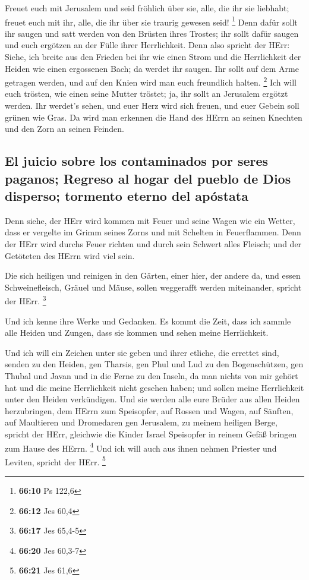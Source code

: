  Freuet euch mit Jerusalem und seid fröhlich über sie,
alle, die ihr sie liebhabt; freuet euch mit ihr, alle, die ihr über sie
traurig gewesen seid! \footnote{\textbf{66:10} Ps 122,6} 
Denn dafür sollt ihr saugen und satt werden von den Brüsten ihres
Trostes; ihr sollt dafür saugen und euch ergötzen an der Fülle ihrer
Herrlichkeit.  Denn also spricht der HErr: Siehe, ich
breite aus den Frieden bei ihr wie einen Strom und die Herrlichkeit der
Heiden wie einen ergossenen Bach; da werdet ihr saugen. Ihr sollt auf
dem Arme getragen werden, und auf den Knien wird man euch freundlich
halten. \footnote{\textbf{66:12} Jes 60,4}  Ich will euch
trösten, wie einen seine Mutter tröstet; ja, ihr sollt an Jerusalem
ergötzt werden.  Ihr werdet's sehen, und euer Herz wird
sich freuen, und euer Gebein soll grünen wie Gras. Da wird man erkennen
die Hand des HErrn an seinen Knechten und den Zorn an seinen Feinden.

\hypertarget{el-juicio-sobre-los-contaminados-por-seres-paganos-regreso-al-hogar-del-pueblo-de-dios-disperso-tormento-eterno-del-apuxf3stata}{%
\subsection{El juicio sobre los contaminados por seres paganos; Regreso
al hogar del pueblo de Dios disperso; tormento eterno del
apóstata}\label{el-juicio-sobre-los-contaminados-por-seres-paganos-regreso-al-hogar-del-pueblo-de-dios-disperso-tormento-eterno-del-apuxf3stata}}

 Denn siehe, der HErr wird kommen mit Feuer und seine
Wagen wie ein Wetter, dass er vergelte im Grimm seines Zorns und mit
Schelten in Feuerflammen.  Denn der HErr wird durchs
Feuer richten und durch sein Schwert alles Fleisch; und der Getöteten
des HErrn wird viel sein.

 Die sich heiligen und reinigen in den Gärten, einer
hier, der andere da, und essen Schweinefleisch, Gräuel und Mäuse, sollen
weggerafft werden miteinander, spricht der HErr. \footnote{\textbf{66:17}
  Jes 65,4-5}

 Und ich kenne ihre Werke und Gedanken. Es kommt die
Zeit, dass ich sammle alle Heiden und Zungen, dass sie kommen und sehen
meine Herrlichkeit.

 Und ich will ein Zeichen unter sie geben und ihrer
etliche, die errettet sind, senden zu den Heiden, gen Tharsis, gen Phul
und Lud zu den Bogenschützen, gen Thubal und Javan und in die Ferne zu
den Inseln, da man nichts von mir gehört hat und die meine Herrlichkeit
nicht gesehen haben; und sollen meine Herrlichkeit unter den Heiden
verkündigen.  Und sie werden alle eure Brüder aus allen
Heiden herzubringen, dem HErrn zum Speisopfer, auf Rossen und Wagen, auf
Sänften, auf Maultieren und Dromedaren gen Jerusalem, zu meinem heiligen
Berge, spricht der HErr, gleichwie die Kinder Israel Speisopfer in
reinem Gefäß bringen zum Hause des HErrn. \footnote{\textbf{66:20} Jes
  60,3-7}  Und ich will auch aus ihnen nehmen Priester
und Leviten, spricht der HErr. \footnote{\textbf{66:21} Jes 61,6}

